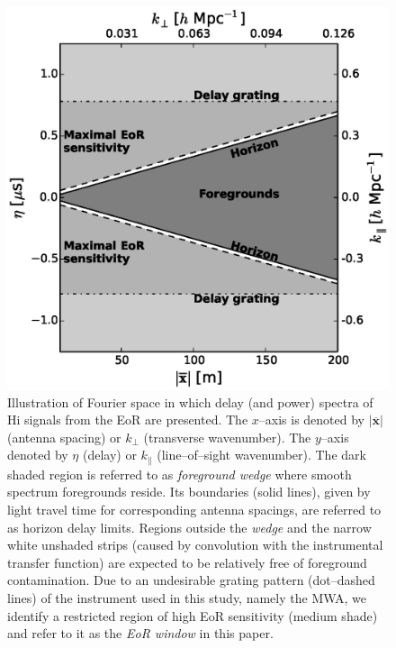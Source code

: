 \documentclass[preprint2,iop,numberedappendix]{emulateapj}
\begin{document}
\begin{figure}[htb]
\centering
\includegraphics[width=\linewidth]{figures/v1_0/fourier_space_185.0_MHz_30.7_MHz.eps}
\caption{Illustration of Fourier space in which delay (and power) spectra of H{\sc i} signals from the EoR are presented. The $x$--axis is denoted by $|\overline{\mathbf{x}}|$ (antenna spacing) or $k_\perp$ (transverse wavenumber). The $y$--axis denoted by $\eta$ (delay) or $k_\parallel$ (line--of--sight wavenumber). The dark shaded region is referred to as {\it foreground wedge} where smooth spectrum foregrounds reside. Its boundaries (solid lines), given by light travel time for corresponding antenna spacings, are referred to as horizon delay limits. Regions outside the {\it wedge} and the narrow white unshaded strips (caused by convolution with the instrumental transfer function) are expected to be relatively free of foreground contamination. Due to an undesirable grating pattern (dot--dashed lines) of the instrument used in this study, namely the MWA, we identify a restricted region of high EoR sensitivity (medium shade) and refer to it as the {\it EoR window} in this paper. \label{fig:fourier-space}}
\end{figure}

\end{document}
